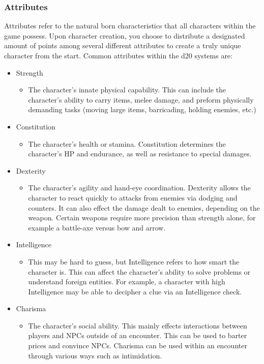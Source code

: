\documentclass[12pt,a4paper]{report}
\begin{document}
		\subsubsection{Attributes}
			Attributes refer to the natural born characteristics that all characters within the game possess. Upon character creation, you choose to distribute a designated amount of points among several different attributes to create a truly unique character from the start. 
			Common attributes within the d20 systems are:
		\begin{itemize}
			\item Strength
			\begin{itemize}
				\item The character's innate physical capability. This can include the character's ability to carry items, melee damage, and preform physically demanding tasks (moving large items, barricading, holding enemies, etc.)
			\end{itemize}
			\item Constitution
			\begin{itemize}
				\item The character's health or stamina. Constitution determines the character's HP and endurance, as well as resistance to special damages. 
			\end{itemize}
			\item Dexterity
			\begin{itemize}
				\item The character's agility and hand-eye coordination. Dexterity allows the character to react quickly to attacks from enemies via dodging and counters. It can also effect the damage dealt to enemies, depending on the weapon. Certain weapons require more precision than strength alone, for example a battle-axe versus bow and arrow.
			\end{itemize}
			\item Intelligence
			\begin{itemize}
				\item This may be hard to guess, but Intelligence refers to how smart the character is. This can affect the character's ability to solve problems or understand foreign entities. For example, a character with high Intelligence may be able to decipher a clue via an Intelligence check.
			\end{itemize}
			\item Charisma
			\begin{itemize}
				\item The character's social ability. This mainly effects interactions between players and NPCs outside of an encounter. This can be used to barter prices and convince NPCs. Charisma can be used within an encounter through various ways such as intimidation. 

\end{itemize}
\end{itemize}
\end{document}
